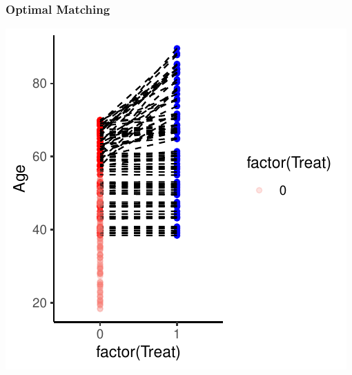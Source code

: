 \documentclass[xcolor=x11names,compress]{beamer}\usepackage[]{graphicx}\usepackage[]{color}
\makeatletter
\def\maxwidth{ %
  \ifdim\Gin@nat@width>\linewidth
    \linewidth
  \else
    \Gin@nat@width
  \fi
}
\newenvironment{knitrout}{}{} %
\renewcommand{\(}{\begin{columns}}
\renewcommand{\)}{\end{columns}}
\newcommand{\<}[1]{\begin{column}{#1}}
\renewcommand{\>}{\end{column}}
\makeatother
\begin{document}
\begin{frame}
\frametitle{Optimal Matching}
\begin{center}
\begin{knitrout}
\color{fgcolor}
\includegraphics[width=\maxwidth]{figure/optimal_matching_3-1} 

\end{knitrout}
\end{center}
\end{frame}
\end{document}
